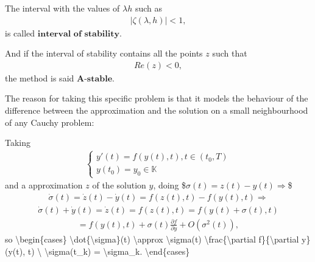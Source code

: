 \documentclass[letterpaper,10pt,english]{jupyterBook}
\begin{document}
\sphinxAtStartPar
The interval with the values of \(\lambda h\) such as
\begin{equation*}
\begin{split}
|\zeta(\lambda, h)|<1,
\end{split}
\end{equation*}
\sphinxAtStartPar
is called \(\textbf{interval of stability}\).

\sphinxAtStartPar
And if the interval of stability contains all the points \(z\) such that
\begin{equation*}
\begin{split}
    Re(z) < 0,
\end{split}
\end{equation*}
\sphinxAtStartPar
the method is said \(\textbf{A-stable}\).

\sphinxAtStartPar
The reason for taking this specific problem is that it models the behaviour of the difference between the approximation and the solution on a small neighbourhood of any Cauchy problem:

\sphinxAtStartPar
Taking
\begin{equation*}
\begin{split}
\begin{cases}
    y'(t) = f(y(t), t), t \in (t_0, T) \\
    y(t_0) = y_0 \in \mathbb{K}
\end{cases}
\end{split}
\end{equation*}
\sphinxAtStartPar
and a approximation \(z\) of the solution \(y\), doing
\$\(
\sigma(t) = z(t) - y(t) \Rightarrow
\)\$
\begin{equation*}
\begin{split}
\dot{\sigma}(t) = \dot{z}(t) - \dot{y}(t) = f(z(t), t) - f(y(t), t) \Rightarrow
\end{split}
\end{equation*}\begin{equation*}
\begin{split}
\dot{\sigma}(t) + \dot{y}(t) = \dot{z}(t) = f(z(t), t) = f(y(t)+\sigma(t), t)
\end{split}
\end{equation*}\begin{equation*}
\begin{split}
 = f(y(t), t) + \sigma(t)\frac{\partial f}{\partial y} + O(\sigma^2(t)),
\end{split}
\end{equation*}
\sphinxAtStartPar
so
\textbackslash{}begin\{cases\}
\textbackslash{}dot\{\textbackslash{}sigma\}(t) \textbackslash{}approx \textbackslash{}sigma(t) \textbackslash{}frac\{\textbackslash{}partial f\}\{\textbackslash{}partial y\} (y(t), t) \textbackslash{}
\textbackslash{}sigma(t\_k) = \textbackslash{}sigma\_k.
\textbackslash{}end\{cases\}
\end{document}
